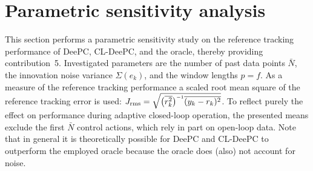 \section{Parametric sensitivity analysis}\label{sec:sensitivity_study}
\noindent This section performs a parametric sensitivity study on the reference tracking performance of \ac{DeePC}, \ac{CL-DeePC}, and the oracle, thereby providing contribution~5. Investigated parameters are the number of past data points $\bar{N}$, the innovation noise variance $\Sigma(e_k)$, and the window lengths $p=f$. As a measure of the reference tracking performance a scaled root mean square of the reference tracking error is used: $J_\mathrm{rms}=\sqrt{\big(\overline{r_k^2}\big)\inv\overline{(y_k-r_k)^2}}$. %
To reflect purely the effect on performance during adaptive closed-loop operation, the presented means exclude the first $\bar{N}$ control actions, which rely in part on open-loop data. Note that in general it is theoretically possible for \ac{DeePC} and \ac{CL-DeePC} to outperform the employed oracle because the oracle does (also) not account for noise.

